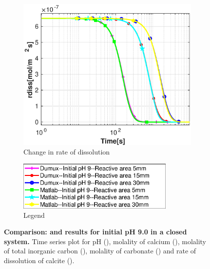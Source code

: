 \begin{figure}
    \hfill
    \begin{subfigure}{.5\linewidth}
            \centering
        \includegraphics[width=\textwidth]{PICTURES/dvm_pH9_rdiss.eps}
        \caption{\small Change in rate of dissolution}
        \label{fig:dvmpH9rdiss}
    \end{subfigure}%
    \begin{subfigure}{.5\linewidth}
            \centering
        \includegraphics[width=0.85\textwidth]{PICTURES/dvm_pH9_legend.eps}
        \caption{\small Legend}
        \label{fig:dvmpH9legend}
    \end{subfigure}%
    \caption[Comparison: \DuMuX and \MATLAB results for initial pH 9.0 in 
    a closed system] {\textbf{Comparison: \DuMuX and \MATLAB results for initial pH 9.0 in 
    a closed system.} \small Time series plot for pH 
    (), molality of calcium (), molality of total 
    inorganic carbon (), molality of carbonate () 
    and rate of dissolution of calcite ().} 
    \label{fig:comparisionDumuxMatlab_pH9.0}
\end{figure}
    
    
\endinput